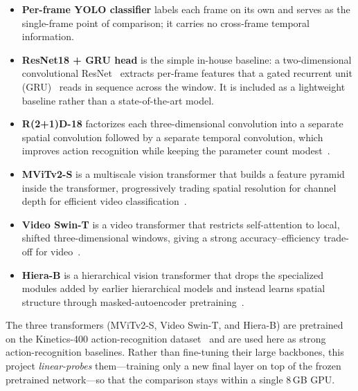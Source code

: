 \documentclass[conference]{IEEEtran}
\begin{document}
\begin{itemize}
    \item \textbf{Per-frame YOLO classifier} labels each frame on its own
    and serves as the single-frame point of comparison; it carries no
    cross-frame temporal information.

    \item \textbf{ResNet18 + GRU head} is the simple in-house baseline: a
    two-dimensional convolutional ResNet~\cite{b11} extracts per-frame
    features that a gated recurrent unit (GRU)~\cite{b12} reads in sequence
    across the window. It is included as a lightweight baseline rather than
    a state-of-the-art model.

    \item \textbf{R(2+1)D-18} factorizes each three-dimensional convolution
    into a separate spatial convolution followed by a separate temporal
    convolution, which improves action recognition while keeping the
    parameter count modest~\cite{b7}.

    \item \textbf{MViTv2-S} is a multiscale vision transformer that builds a
    feature pyramid inside the transformer, progressively trading spatial
    resolution for channel depth for efficient video classification~\cite{b8}.

    \item \textbf{Video Swin-T} is a video transformer that restricts
    self-attention to local, shifted three-dimensional windows, giving a
    strong accuracy--efficiency trade-off for video~\cite{b9}.

    \item \textbf{Hiera-B} is a hierarchical vision transformer that drops
    the specialized modules added by earlier hierarchical models and instead
    learns spatial structure through masked-autoencoder pretraining~\cite{b10}.
\end{itemize}

The three transformers (MViTv2-S, Video Swin-T, and Hiera-B) are pretrained
on the Kinetics-400 action-recognition dataset~\cite{b13} and are used here
as strong action-recognition baselines. Rather than fine-tuning their large
backbones, this project \emph{linear-probes} them---training only a new final
layer on top of the frozen pretrained network---so that the comparison stays
within a single 8\,GB GPU.


\end{document}

